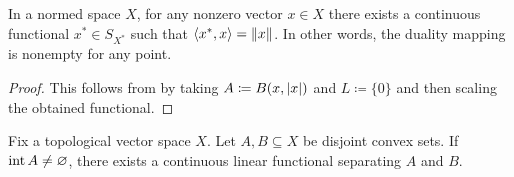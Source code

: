 \begin{corollary}\label{thm:hahn_banach_implies_duality_mapping_nonempty}\cite[25]{Йоффе1974}
  In a normed space \( X \), for any nonzero vector \( x \in X \) there exists a continuous functional \( x^* \in S_{X^*} \) such that \( \left\langle x^*, x \right\rangle = \left\Vert x \right\Vert \). In other words, the duality mapping is nonempty for any point.
\end{corollary}
\begin{proof}
  This follows from  by taking \( A \coloneqq B(x, \left\vert x \right\vert) \) and \( L \coloneqq \{ 0 \} \) and then scaling the obtained functional.
\end{proof}

\begin{theorem}\label{thm:hahn_banach_hyperplane_separation}\cite[25]{Йоффе1974}
  Fix a topological vector space \( X \). Let \( A, B \subseteq X \) be disjoint convex sets. If \( \operatorname{int}{A} \neq \varnothing \), there exists a continuous linear functional separating \( A \) and \( B \).
\end{theorem}

